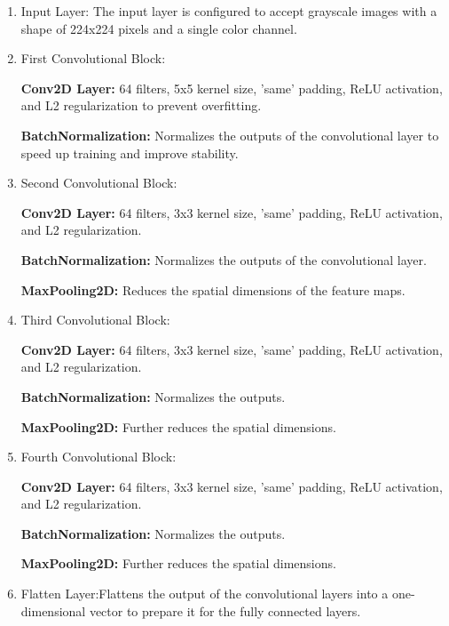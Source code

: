 \begin{enumerate}
    \begin{enumerate}
        \item Input Layer: The input layer is configured to accept grayscale images with a shape of 224x224 pixels and a single color channel.
        
        \item First Convolutional Block:

        \textbf{Conv2D Layer:} 64 filters, 5x5 kernel size, 'same' padding, ReLU activation, and L2 regularization to prevent overfitting.
        
        \textbf{BatchNormalization:} Normalizes the outputs of the convolutional layer to speed up training and improve stability.
        
        \item Second Convolutional Block:

        \textbf{Conv2D Layer:} 64 filters, 3x3 kernel size, 'same' padding, ReLU activation, and L2 regularization.
        
        \textbf{BatchNormalization:} Normalizes the outputs of the convolutional layer.
        
        \textbf{MaxPooling2D:} Reduces the spatial dimensions of the feature maps.
        
        \item Third Convolutional Block:

        \textbf{Conv2D Layer:} 64 filters, 3x3 kernel size, 'same' padding, ReLU activation, and L2 regularization.
        
        \textbf{BatchNormalization:} Normalizes the outputs.
        
        \textbf{MaxPooling2D:} Further reduces the spatial dimensions.
        
        \item Fourth Convolutional Block:

        \textbf{Conv2D Layer:} 64 filters, 3x3 kernel size, 'same' padding, ReLU activation, and L2 regularization.
        
        \textbf{BatchNormalization:} Normalizes the outputs.
        
        \textbf{MaxPooling2D:} Further reduces the spatial dimensions.
        
        \item Flatten Layer:Flattens the output of the convolutional layers into a one-dimensional vector to prepare it for the fully connected layers.
        

\end{enumerate}
\end{enumerate}
